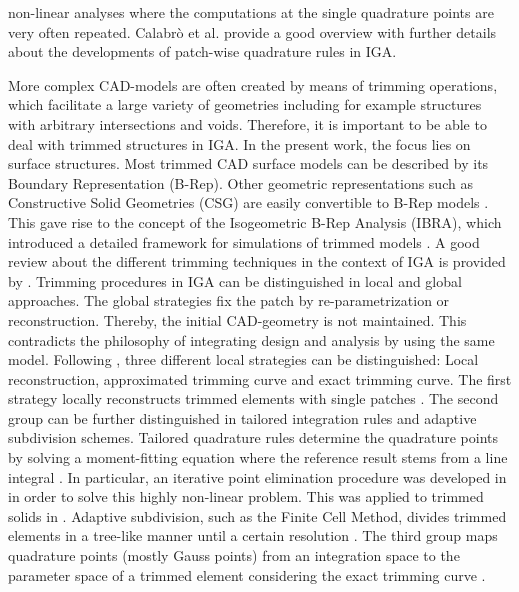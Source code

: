 \documentclass[3p]{elsarticle}
\begin{document}
non-linear analyses where the computations at the single quadrature points are very often repeated. Calabrò et al. \cite{Calabro2019} provide a good overview with further details about the developments of patch-wise quadrature rules in IGA. \bigskip

More complex CAD-models are often created by means of trimming operations, which facilitate a large variety of geometries including for example structures with arbitrary intersections and voids. Therefore, it is important to be able to deal with trimmed structures in IGA. In the present work, the focus lies on surface structures. Most trimmed CAD surface models can be described by its Boundary Representation (B-Rep). Other geometric representations such as Constructive Solid Geometries (CSG) are easily convertible to B-Rep models \cite{Breitenberger2016}. This gave rise to the concept of the Isogeometric B-Rep Analysis (IBRA), which introduced a detailed framework for simulations of trimmed models \cite{Teschemacher2018,Breitenberger2015}. A good review about the different trimming techniques in the context of IGA is provided by \cite{Marussig2018}. Trimming procedures in IGA can be distinguished in local and global approaches. The global strategies fix the patch by re-parametrization or reconstruction. Thereby, the initial CAD-geometry is not maintained. This contradicts the philosophy of integrating design and analysis by using the same model. Following \cite{Marussig2018}, three different local strategies can be distinguished: Local reconstruction, approximated trimming curve and exact trimming curve. The first strategy locally reconstructs trimmed elements with single patches \cite{Schmidt2012}. The second group can be further distinguished in tailored integration rules and adaptive subdivision schemes. Tailored quadrature rules determine the quadrature points by solving a moment-fitting equation where the reference result stems from a line integral \cite{Nagy2015}. In particular, an iterative point elimination procedure was developed in \cite{Nagy2015} in order to solve this highly non-linear problem. This was applied to trimmed solids in \cite{Messmer2022}. Adaptive subdivision, such as the Finite Cell Method, divides trimmed elements in a tree-like manner until a certain resolution \cite{Rank2012}. The third group maps quadrature points (mostly Gauss points) from an integration space to the parameter space of a trimmed element considering the exact trimming curve \cite{Breitenberger2016,Kim2009,Kim2010,Guo2018}. \bigskip
\end{document}
